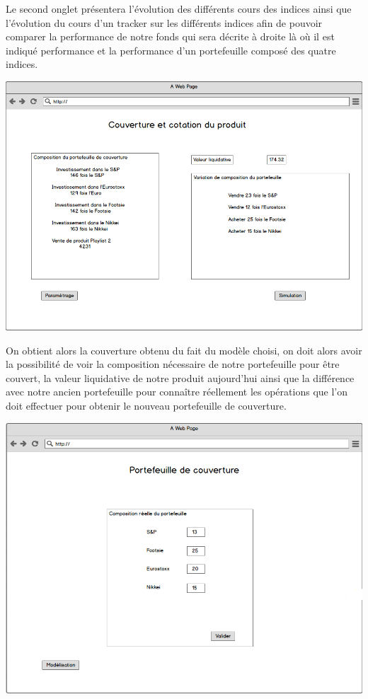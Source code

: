 \documentclass[french,12pt,a4paper]{article}
\begin{document}
Le second onglet présentera l'évolution des différents cours des indices ainsi que l'évolution du cours d'un tracker sur les différents indices afin de pouvoir comparer la performance de notre fonds qui sera décrite à droite là où il est indiqué performance et la performance d'un portefeuille composé des quatre indices.


\begin{center}
\includegraphics[scale=0.4]{../Maquette_4.png}
\end{center}

On obtient alors la couverture obtenu du fait du modèle choisi, on doit alors avoir la possibilité de voir la composition nécessaire de notre portefeuille pour être couvert, la valeur liquidative de notre produit aujourd'hui ainsi que la différence avec notre ancien portefeuille pour connaître réellement les opérations que l'on doit effectuer pour obtenir le nouveau portefeuille de couverture.

\begin{center}
\includegraphics[scale=0.4]{../Maquette_6.png}
\end{center}
\end{document}
